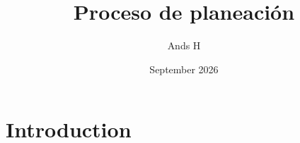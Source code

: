 \documentclass{article}
\title{Proceso de planeación}
\author{Ands H}
\date{September 2026}
\begin{document}
\maketitle

\section{Introduction}
\end{document}
